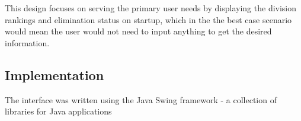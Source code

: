 This design focuses on serving the primary user needs by displaying the division 
rankings and elimination status on startup, which in the the best case scenario 
would mean the user would not need to input anything to get the desired information.

\subsection{Implementation}
The interface was written using the Java Swing framework - a collection of libraries
for Java applications 
